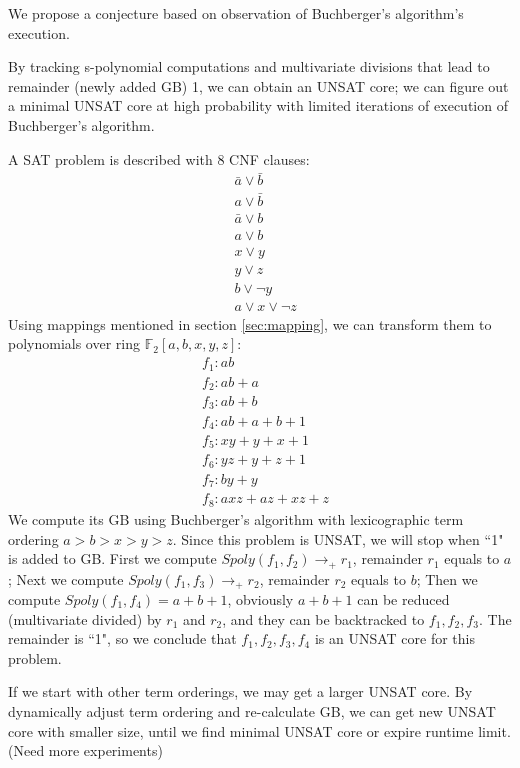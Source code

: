 We propose a conjecture based on observation of Buchberger's algorithm's execution.
\begin{Conjecture}
By tracking s-polynomial computations and multivariate divisions that lead to remainder (newly added GB)
1, we can obtain an UNSAT core; we can figure out a minimal UNSAT core at high probability with limited
iterations of execution of Buchberger's algorithm.
\end{Conjecture}
\begin{Example}
A SAT problem is described with 8 CNF clauses:
\begin{align*}
&\bar{a}\lor\bar{b}\\
&a\lor\bar{b}\\
&\bar{a}\lor b\\
&a\lor b\\
&x\lor y\\
&y\lor z\\
&b\lor \neg y\\
&a\lor x\lor \neg z
\end{align*}
Using mappings mentioned in section \ref{sec:mapping}, we can transform them to
polynomials over ring $\mathbb F_2[a,b,x,y,z]$:
\begin{align*}
&f_1:ab\\
&f_2:ab+a\\
&f_3:ab+b\\
&f_4:ab+a+b+1\\
&f_5:xy+y+x+1\\
&f_6:yz+y+z+1\\
&f_7:by+y\\
&f_8:axz+az+xz+z
\end{align*}
We compute its GB using Buchberger's algorithm with lexicographic term ordering $a>b>x>y>z$.
Since this problem is UNSAT, we will stop when ``1" is added to GB.
First we compute $Spoly(f_1,f_2)\xrightarrow{\ }_{+} r_1$, remainder $r_1$ equals to $a$;
Next we compute $Spoly(f_1,f_3)\xrightarrow{\ }_{+} r_2$, remainder $r_2$ equals to $b$;
Then we compute $Spoly(f_1,f_4) = a+b+1$, obviously $a+b+1$ can be reduced (multivariate divided) by
$r_1$ and $r_2$, and they can be backtracked to $f_1,f_2,f_3$. The remainder is ``1", so we
conclude that $f_1,f_2,f_3,f_4$ is an UNSAT core for this problem.
\end{Example}
If we start with other term orderings, we may get a larger UNSAT core. By dynamically adjust
term ordering and re-calculate GB, we can get new UNSAT core with smaller size, until
we find minimal UNSAT core or expire runtime limit. (Need more experiments)